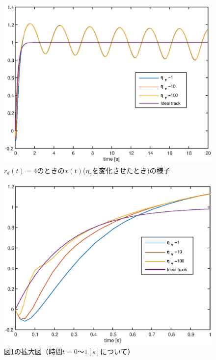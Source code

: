 \documentclass[a4paper,12pt]{jarticle}
\begin{document}
%
%
\begin{figure}[htb]
    \begin{center}
       \includegraphics[width=140mm]{fig/x_rd4_Etag.eps}
        \caption{$r_d(t)=4$のときの$x(t)$($\eta_\gamma$を変化させたとき)の様子}
        \label{fig:x_rd4etag}
    \end{center}
\end{figure}
%
%
\begin{figure}[htb]
    \begin{center}
	 \includegraphics[width=140mm]{fig/x_rd4_Etag_2.eps}
        \caption{図\ref{fig:x_rd4etag}の拡大図（時間$t=0〜1[s]$について）}
        \label{fig:x_rd4etag2}
    \end{center}
\end{figure}
\end{document}

